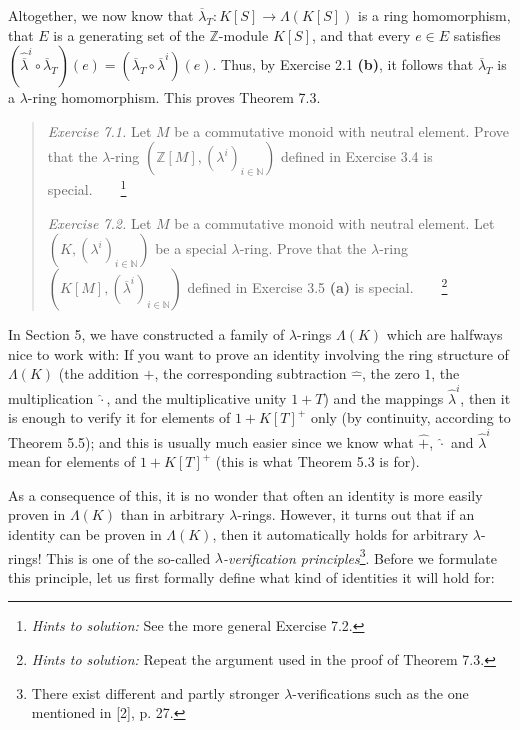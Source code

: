 \documentclass[12pt,final,notitlepage,onecolumn,german]{article}%
\begin{document}
Altogether, we now know that $\overline{\lambda}_{T}:K\left[  S\right]
\rightarrow\Lambda\left(  K\left[  S\right]  \right)  $ is a ring
homomorphism, that $E$ is a generating set of the $\mathbb{Z}$-module
$K\left[  S\right]  $, and that every $e\in E$ satisfies $\left(
\widehat{\overline{\lambda}}^{i}\circ\overline{\lambda}_{T}\right)  \left(
e\right)  =\left(  \overline{\lambda}_{T}\circ\overline{\lambda}^{i}\right)
\left(  e\right)  $. Thus, by Exercise 2.1 \textbf{(b)}, it follows that
$\overline{\lambda}_{T}$ is a $\lambda$-ring homomorphism. This proves Theorem 7.3.

\begin{quotation}
\textit{Exercise 7.1.} Let $M$ be a commutative monoid with neutral element.
Prove that the $\lambda$-ring $\left(  \mathbb{Z}\left[  M\right]  ,\left(
\lambda^{i}\right)  _{i\in\mathbb{N}}\right)  $ defined in Exercise 3.4 is
special.\ \ \ \ \footnote{\textit{Hints to solution:} See the more general
Exercise 7.2.}

\textit{Exercise 7.2.} Let $M$ be a commutative monoid with neutral element.
Let $\left(  K,\left(  \lambda^{i}\right)  _{i\in\mathbb{N}}\right)  $ be a
special $\lambda$-ring. Prove that the $\lambda$-ring $\left(  K\left[
M\right]  ,\left(  \overline{\lambda}^{i}\right)  _{i\in\mathbb{N}}\right)  $
defined in Exercise 3.5 \textbf{(a)} is
special.\ \ \ \ \footnote{\textit{Hints to solution:} Repeat the argument used
in the proof of Theorem 7.3.}
\end{quotation}

\begin{center}
\end{center}

In Section 5, we have constructed a family of $\lambda$-rings $\Lambda\left(
K\right)  $ which are halfways nice to work with: If you want to prove an
identity involving the ring structure of $\Lambda\left(  K\right)  $ (the
addition $\widehat{+}$, the corresponding subtraction $\widehat{-}$, the zero
$1$, the multiplication $\widehat{\cdot}$, and the multiplicative unity $1+T$)
and the mappings $\widehat{\lambda}^{i}$, then it is enough to verify it for
elements of $1+K\left[  T\right]  ^{+}$ only (by continuity, according to
Theorem 5.5); and this is usually much easier since we know what $\widehat{+}%
$, $\widehat{\cdot}$ and $\widehat{\lambda}^{i}$ mean for elements of
$1+K\left[  T\right]  ^{+}$ (this is what Theorem 5.3 is for).

As a consequence of this, it is no wonder that often an identity is more
easily proven in $\Lambda\left(  K\right)  $ than in arbitrary $\lambda
$-rings. However, it turns out that if an identity can be proven in
$\Lambda\left(  K\right)  $, then it automatically holds for arbitrary
$\lambda$-rings! This is one of the so-called $\lambda$\textit{-verification
principles}\footnote{There exist different and partly stronger $\lambda
$-verifications such as the one mentioned in [2], p. 27.}. Before we formulate
this principle, let us first formally define what kind of identities it will
hold for:
\end{document}
